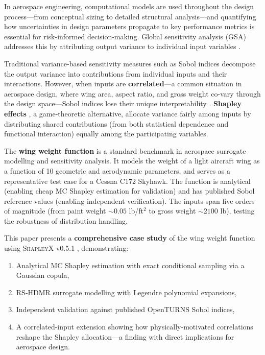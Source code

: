 \documentclass[11pt,a4paper]{article}
\begin{document}
In aerospace engineering, computational models are used throughout the design process---from conceptual sizing to detailed structural analysis---and quantifying how uncertainties in design parameters propagate to key performance metrics is essential for risk-informed decision-making. Global sensitivity analysis (GSA) addresses this by attributing output variance to individual input variables \cite{Saltelli2008}.

Traditional variance-based sensitivity measures such as Sobol indices \cite{Sobol1993} decompose the output variance into contributions from individual inputs and their interactions. However, when inputs are \textbf{correlated}---a common situation in aerospace design, where wing area, aspect ratio, and gross weight co-vary through the design space---Sobol indices lose their unique interpretability \cite{Chastaing2012}. \textbf{Shapley effects} \cite{Owen2014,Song2016,Iooss2019}, a game-theoretic alternative, allocate variance fairly among inputs by distributing shared contributions (from both statistical dependence and functional interaction) equally among the participating variables.

The \textbf{wing weight function} \cite{Forrester2008} is a standard benchmark in aerospace surrogate modelling and sensitivity analysis. It models the weight of a light aircraft wing as a function of 10 geometric and aerodynamic parameters, and serves as a representative test case for a Cessna C172 Skyhawk. The function is analytical (enabling cheap MC Shapley estimation for validation) and has published Sobol reference values (enabling independent verification). The inputs span five orders of magnitude (from paint weight $\sim 0.05$ lb/ft$^2$ to gross weight $\sim 2100$ lb), testing the robustness of distribution handling.

This paper presents a \textbf{comprehensive case study} of the wing weight function using \textsc{ShapleyX} v0.5.1 \cite{ShapleyX2026,ShapleyXRepo}, demonstrating:

\begin{enumerate}[nosep]
    \item Analytical MC Shapley estimation with exact conditional sampling via a Gaussian copula,
    \item RS-HDMR surrogate modelling with Legendre polynomial expansions,
    \item Independent validation against published OpenTURNS Sobol indices,
    \item A correlated-input extension showing how physically-motivated correlations reshape the Shapley allocation---a finding with direct implications for aerospace design.
\end{enumerate}
\end{document}
